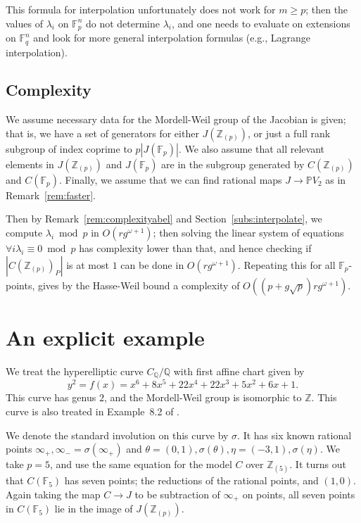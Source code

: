\documentclass[12pt]{article}
\newcommand{\Z}{\mathbb{Z}}
\newcommand{\Q}{\mathbb{Q}}
\renewcommand{\P}{\mathbb{P}}
\newcommand{\F}{\mathbb{F}}
\theoremstyle{plain}
\theoremstyle{definition}
\theoremstyle{remark}
\begin{document}
This formula for interpolation unfortunately does not work for $m \geq p$; then the values of $\lambda_i$ on $\F_p^{n}$ do not determine $\lambda_i$, and one needs to evaluate on extensions on $\F_q^n$ and look for more general interpolation formulas (e.g., Lagrange interpolation).

\subsection{Complexity}
We assume necessary data for the Mordell-Weil group of the Jacobian is given; that is, we have a set of generators for either $J(\Z_{(p)})$, or just a full rank subgroup of index coprime to $p|J(\F_p)|$. We also assume that all relevant elements in $J(\Z_{(p)})$ and $J(\F_p)$ are in the subgroup generated by $C(\Z_{(p)})$ and $C(\F_p)$. Finally, we assume that we can find rational maps $J \to \P V_2$ as in Remark~\ref{rem:faster}.

Then by Remark~\ref{rem:complexityabel} and Section~\ref{subs:interpolate}, we compute $\lambda_i \bmod p$ in $O(rg^{\omega+1})$; then solving the linear system of equations $\forall i \lambda_i \equiv 0 \bmod p$ has complexity lower than that, and hence checking if $|C(\Z_{(p)})_P|$ is at most $1$ can be done in $O(rg^{\omega+1})$. Repeating this for all $\F_p$-points, gives by the Hasse-Weil bound a complexity of $O\left((p + g\sqrt{p})rg^{\omega+1}\right)$.

\section{An explicit example}
\label{section:example}
We treat the hyperelliptic curve $C_\Q/\Q$ with first affine chart given by
\[
y^2 = f(x) = x^6+ 8x^5+ 22x^4+ 22x^3+ 5x^2+ 6x+ 1.
\]
This curve has genus $2$, and the Mordell-Weil group is isomorphic to $\Z$. This curve is also treated in Example~8.2 of \cite{poonen12}.

We denote the standard involution on this curve by $\sigma$. It has six known rational points $\infty_+,\infty_- = \sigma(\infty_+)$ and $\theta = (0,1),\sigma(\theta),\eta=(-3,1),\sigma(\eta)$. We take $p = 5$, and use the same equation for the model $C$ over $\Z_{(5)}$. It turns out that $C(\F_5)$ has seven points; the reductions of the rational points, and $(1,0)$. Again taking the map $C \to J$ to be subtraction of $\infty_+$ on points, all seven points in $C(\F_5)$ lie in the image of $J(\Z_{(p)})$.
\end{document}
